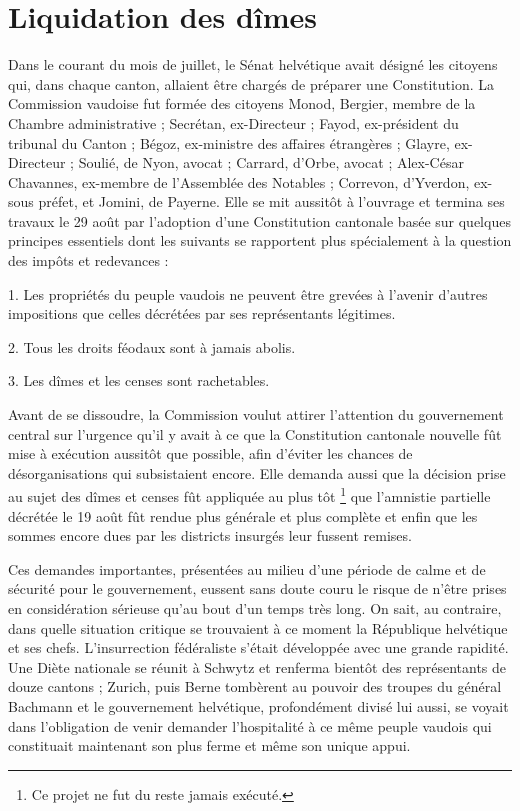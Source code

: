 \documentclass[french,twoside]{book} %
\begin{document}
\section[Liquidation des dîmes]{Liquidation des dîmes}
\noindent Dans le courant du mois de juillet, le Sénat helvétique avait désigné les citoyens qui, dans chaque canton, allaient être chargés de préparer une Constitution. La Commission vaudoise fut formée des citoyens Monod, Bergier, membre de la Chambre administrative ; Secrétan, ex-Directeur ; Fayod, ex-président du tribunal du Canton ; Bégoz, ex-ministre des affaires étrangères ; Glayre, ex-Directeur ; Soulié, de Nyon, avocat ; Carrard, d’Orbe, avocat ; Alex-César Chavannes, ex-membre de l’Assemblée des Notables ; Correvon, d’Yverdon, ex-sous préfet, et Jomini, de Payerne. Elle se mit aussitôt à l’ouvrage et termina ses travaux le 29 août par l’adoption d’une Constitution cantonale basée sur quelques principes essentiels dont les suivants se rapportent plus spécialement à la question des impôts et redevances :\par
1. Les propriétés du peuple vaudois ne peuvent être grevées à l’avenir d’autres impositions que celles décrétées par ses représentants légitimes.\par
2. Tous les droits féodaux sont à jamais abolis.\par
3. Les dîmes et les censes sont rachetables.\par
Avant de se dissoudre, la Commission voulut attirer l’attention du gouvernement central sur l’urgence qu’il y avait à ce que la Constitution cantonale nouvelle fût mise à exécution aussitôt que possible, afin d’éviter les chances de désorganisations qui subsistaient encore. Elle demanda aussi que la décision prise au sujet des dîmes et censes fût appliquée au plus tôt \footnote{Ce projet ne fut du reste jamais exécuté.} que l’amnistie partielle décrétée le 19 août fût rendue plus générale et plus complète et enfin que les sommes encore dues par les districts insurgés leur fussent remises.\par
Ces demandes importantes, présentées au milieu d’une période de calme et de sécurité pour le gouvernement, eussent sans doute couru le risque de n’être prises en considération sérieuse qu’au bout d’un temps très long. On sait, au contraire, dans quelle situation critique se trouvaient à ce moment la République helvétique et ses chefs. L’insurrection fédéraliste s’était développée avec une grande rapidité. Une Diète nationale se réunit à Schwytz et renferma bientôt des représentants de douze cantons ; Zurich, puis Berne tombèrent au pouvoir des troupes du général Bachmann et le gouvernement helvétique, profondément divisé lui aussi, se voyait dans l’obligation de venir demander l’hospitalité à ce même peuple vaudois qui constituait maintenant son plus ferme et même son unique appui.\par
\end{document}
